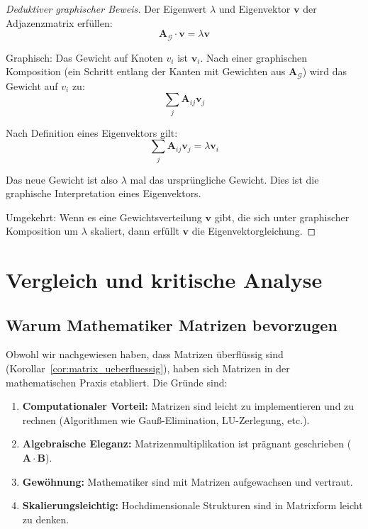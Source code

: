 \documentclass[12pt, a4paper]{article}
\theoremstyle{definition}
\theoremstyle{remark}
\newcommand{\vA}{\bm{A}}
\newcommand{\vB}{\bm{B}}
\newcommand{\Graph}{\mathcal{G}}
\begin{document}
\begin{proof}[Deduktiver graphischer Beweis]
Der Eigenwert $\lambda$ und Eigenvektor $\mathbf{v}$ der Adjazenzmatrix erfüllen:
\[
  \vA_{\Graph} \cdot \mathbf{v} = \lambda \mathbf{v}
\]

Graphisch: Das Gewicht auf Knoten $v_i$ ist $\mathbf{v}_i$. Nach einer graphischen Komposition (ein Schritt entlang der Kanten mit Gewichten aus $\vA_{\Graph}$) wird das Gewicht auf $v_i$ zu:
\[
  \sum_{j} \vA_{ij} \mathbf{v}_j
\]

Nach Definition eines Eigenvektors gilt:
\[
  \sum_{j} \vA_{ij} \mathbf{v}_j = \lambda \mathbf{v}_i
\]

Das neue Gewicht ist also $\lambda$ mal das ursprüngliche Gewicht. Dies ist die graphische Interpretation eines Eigenvektors.

Umgekehrt: Wenn es eine Gewichtsverteilung $\mathbf{v}$ gibt, die sich unter graphischer Komposition um $\lambda$ skaliert, dann erfüllt $\mathbf{v}$ die Eigenvektorgleichung.
\end{proof}

\section{Vergleich und kritische Analyse}
\label{sec:kritische_analyse}

\subsection{Warum Mathematiker Matrizen bevorzugen}
\label{subsec:warum_matrizen}

Obwohl wir nachgewiesen haben, dass Matrizen überflüssig sind (Korollar~\ref{cor:matrix_ueberfluessig}), haben sich Matrizen in der mathematischen Praxis etabliert. Die Gründe sind:

\begin{enumerate}[label=(\alph*)]
  \item \textbf{Computationaler Vorteil:} Matrizen sind leicht zu implementieren und zu rechnen (Algorithmen wie Gauß-Elimination, LU-Zerlegung, etc.).
  \item \textbf{Algebraische Eleganz:} Matrizenmultiplikation ist prägnant geschrieben ($\vA \cdot \vB$).
  \item \textbf{Gewöhnung:} Mathematiker sind mit Matrizen aufgewachsen und vertraut.
  \item \textbf{Skalierungsleichtig:} Hochdimensionale Strukturen sind in Matrixform leicht zu denken.
\end{enumerate}
\end{document}
